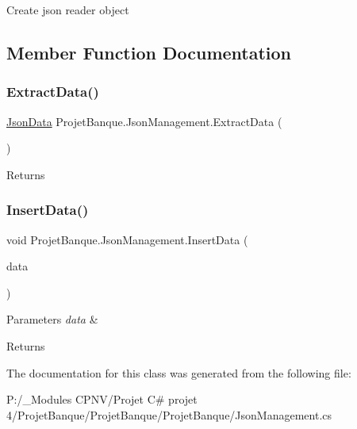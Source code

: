 Create json reader object 



\subsection{Member Function Documentation}
\mbox{\label{class_projet_banque_1_1_json_management_a652a9eb08a2f0a52d6c5b43471ca2944}} 
\subsubsection{\texorpdfstring{ExtractData()}{ExtractData()}}
{\footnotesize\ttfamily \mbox{\hyperlink{class_projet_banque_1_1_json_data}{Json\+Data}} Projet\+Banque.\+Json\+Management.\+Extract\+Data (\begin{DoxyParamCaption}{ }\end{DoxyParamCaption})}





\begin{DoxyReturn}{Returns}

\end{DoxyReturn}
\mbox{\label{class_projet_banque_1_1_json_management_ab7c696c086a0c83cd6e666b40a57e192}} 
\subsubsection{\texorpdfstring{InsertData()}{InsertData()}}
{\footnotesize\ttfamily void Projet\+Banque.\+Json\+Management.\+Insert\+Data (\begin{DoxyParamCaption}\item[{\mbox{\hyperlink{class_projet_banque_1_1_json_data}{Json\+Data}}}]{data }\end{DoxyParamCaption})}






\begin{DoxyParams}{Parameters}
{\em data} & \\
\hline
\end{DoxyParams}
\begin{DoxyReturn}{Returns}

\end{DoxyReturn}


The documentation for this class was generated from the following file\+:\begin{DoxyCompactItemize}
\item 
P\+:/\+\_\+\+Modules C\+P\+N\+V/\+Projet C\# projet 4/\+Projet\+Banque/\+Projet\+Banque/\+Projet\+Banque/Json\+Management.\+cs\end{DoxyCompactItemize}
